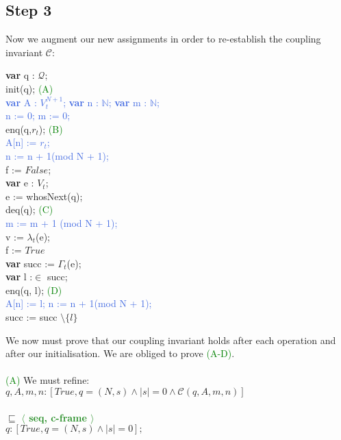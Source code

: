 \documentclass[a4paper]{scrartcl}
\newcommand{\N}{\mathbb{N}}
\newcommand{\C}{\mathcal{C}}
\newcommand{\refinedby}{\sqsubseteq} %
\newcommand{\rc}[1]{ $\refinedby$ \quad \textbf{\textcolor{ForestGreen}{$\langle$ #1 $\rangle$}}}
\newcommand{\ab}[1]{\textcolor{WildStrawberry}{#1}}
\newcommand{\con}[1]{\textcolor{RoyalBlue}{#1}}
\newcommand{\tabb}{\null \quad}
\begin{document}
{\subsection{Step 3}
%
Now we augment our new assignments in order to re-establish the coupling invariant $\C$: \\
%
%
\begin{algorithm}[H]
\textbf{var} q : $\mathcal{Q};$ \\
\ab{init(q)}; \textcolor{green}{\tabb (A)}\\ 
\con{
\textbf{var} A : $V_t^{N+1}$; 
\textbf{var} n : $\N$;
\textbf{var} m : $\N$;
} \\
\con {
n := 0; m := 0;
} \\
\ab{enq(q,$r_t$)}; \textcolor{green}{\tabb (B)}\\
\con{A[n] := $r_t$; \\
n := n + 1(mod N + 1);} \\
f := $False$; \\
\While {$\neg( f \lor \ab{isEmpty(q)})$} {
	\textbf{var} e : $V_t$; \\
	\ab{e := whosNext(q)}; \\
	\ab{deq(q)}; \textcolor{green}{\tabb (C)}\\
	\con{m := m + 1 (mod N + 1);} \\
	 {
		v := $\lambda_t$(e); \\
		f := $True$ \\
	} {
		\textbf{var} succ := $\Gamma_t$(e); \\
		 {
			\textbf{var} l :$\in$ succ; \\
			\ab{enq(q, l)}; \textcolor{green}{\tabb (D)}\\
			\con{
			A[n] := l; n := n + 1(mod N + 1);
			} \\
			succ := succ $\setminus \{l\}$ \\
		}
	}
}
\end{algorithm}
%
%
We now must prove that our coupling invariant holds after each operation and after our initialisation. We are obliged to prove \textcolor{green}{(A-D)}.\\ \\
%
\textcolor{green}{(A)}
We must refine: \\
%
$q, A, m, n : [True, q = (N,s) \land |s| = 0 \land \C(q,A,m,n)]$ \\ \\ 
%
\rc{seq, c-frame} \\
$q : [True, q = (N,s) \land |s| = 0];$ \\
}
\end{document}

